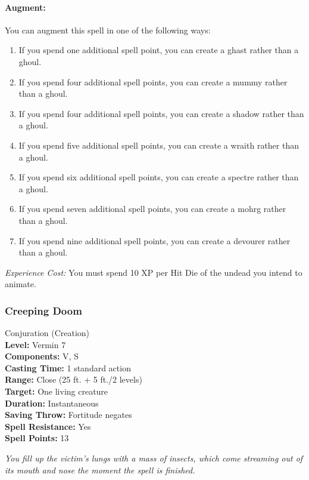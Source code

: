 \paragraph{Augment:} You can augment this spell in one of the following ways:
\begin{enumerate}
 \item If you spend one additional spell point, you can create a ghast rather than a ghoul.
 \item If you spend four additional spell points, you can create a mummy rather than a ghoul.
 \item If you spend four additional spell points, you can create a shadow rather than a ghoul.
 \item If you spend five additional spell points, you can create a wraith rather than a ghoul.
 \item If you spend six additional spell points, you can create a spectre rather than a ghoul.
 \item If you spend seven additional spell points, you can create a mohrg rather than a ghoul.
 \item If you spend nine additional spell points, you can create a devourer rather than a ghoul.
\end{enumerate}

\emph{Experience Cost:} You must spend 10 XP per Hit Die of the undead you intend to animate.

\subsubsection{Creeping Doom}
\label{Spell:CreepingDoom}
Conjuration (Creation)
\\ \textbf{Level:} Vermin 7
\\ \textbf{Components:} V, S
\\ \textbf{Casting Time:} 1 standard action
\\ \textbf{Range:} Close (25 ft. + 5 ft./2 levels)
\\ \textbf{Target:} One living creature
\\ \textbf{Duration:} Instantaneous
\\ \textbf{Saving Throw:} Fortitude negates
\\ \textbf{Spell Resistance:} Yes
\\ \textbf{Spell Points:} 13

\emph{You fill up the victim's lungs with a mass of insects, which come streaming out of its mouth and nose the moment the spell is finished.}

